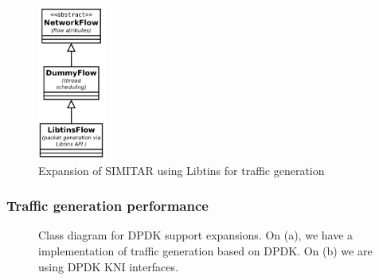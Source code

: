 \begin{figure}[!ht]
	\centering
	\includegraphics[height=2.0in]{figures/ch6/libtins-flow}
	\caption{Expansion of SIMITAR using Libtins for traffic generation}
	\label{fig:libtins-flow}
\end{figure}

\subsubsection{Traffic generation performance}


\begin{figure}[h!]
	\centering
	\hspace{0mm}
	\caption{Class diagram for DPDK support expansions. On (a), we have a implementation of traffic generation based on DPDK. On (b) we are using DPDK KNI interfaces.}
	\label{fig:DpdkFlow}
\end{figure}

